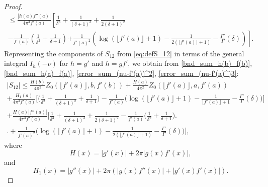 \documentclass[11pt,letterpaper,oneside,reqno]{amsart}
\renewcommand{\^}[1]{\widehat{#1}}
\numberwithin{equation}{section}
\theoremstyle{remark}
\begin{document}
\begin{proof}
\begin{multline}
\leq  \frac{|h(a)f''(a)|}{4\pi^3 f'(a)}
\left[ 
\frac1{\delta^3}+\frac1{(\delta+1)^3}+\frac1{2(\delta+1)^2} \right.\\
- \frac1{f'(a)}\left( \frac1{\delta^2} + \frac1{\delta+1} \right) 
\left. +\frac1{f'(a)^2}\left( \log(\lfloor f'(a) \rfloor+1)-\frac1{2(\lfloor f'(a) \rfloor+1)} - \frac{\Gamma'}{\Gamma}(\delta) \right)\right] . \label{error_sum_(nu-f'(a)^)3}
\end{multline}
%
Representing the components of $S_{12}$ from \eqref{eq:defS_12} in terms of the general integral $I_h(-\nu)$ for $h=g'$ and $h=gf'$, we obtain  from \eqref{bnd_sum_h(b)_f(b)}, \eqref{bnd_sum_h(a)_f(a)}, \eqref{error_sum_(nu-f'(a))^2}, \eqref{error_sum_(nu-f'(a)^)3}:
\begin{multline}
\label{bnd-S12-final}
|S_{12}| 
\leq  \frac{H(b)}{4\pi^2 } Z_0(\lfloor f'(a) \rfloor, b , f'(b)) + \frac{H(a)}{4\pi^2 } Z_0(\lfloor f'(a) \rfloor, a, f'(a))
\\ + \frac{H_1(a)}{4\pi^3 f'(a)} \Big[ \Big( \frac{1}{\delta^2} + \frac{1}{(\delta+1)^2} + \frac{1}{\delta+1}\Big) 
- \frac{1}{f'(a)} \Big( \log(\lfloor f'(a) \rfloor+1) - \frac{1}{\lfloor f'(a) \rfloor+1} - \frac{\Gamma'}{\Gamma}(\delta) \Big) \Big]
\\  +  \frac{H(a)|f''(a)|}{4\pi^3 f'(a)} \Big[ \frac{1}{\delta^3} + \frac{1}{(\delta+1)^3} + \frac{1}{2(\delta+1)^2} - \frac{1}{f'(a)} \Big( \frac{1}{\delta^2} + \frac{1}{\delta+1} \Big) 
\Big. \\  \Big. 
+ \frac{1}{f'(a)^2} \Big( \log(\lfloor f'(a) \rfloor+1) - \frac{1}{2(\lfloor f'(a) \rfloor+1)} - \frac{\Gamma'}{\Gamma}(\delta) \Big) \Big] , 
\end{multline}
where \begin{equation}
    H(x) = |g'(x)| + 2\pi|g(x)f'(x)|, \label{eq:defH(x)}
\end{equation} and \begin{equation}
    H_1(x)=|g''(x)|+2\pi( |g(x)f''(x)|+|g'(x)f'(x)|). \label{eq:defH_1(x)}
\end{equation}
\smallskip


\end{proof}
\end{document}
